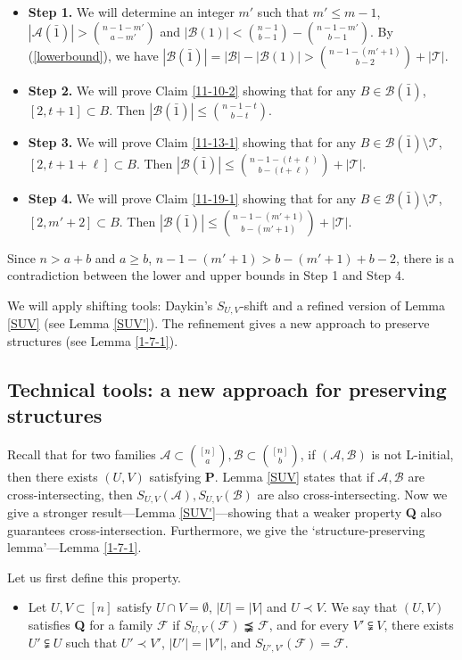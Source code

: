 \documentclass[11pt]{article}
\newcommand{\m}{\mathcal}
\begin{document}
\begin{itemize}
    \item 
{\bf Step 1.}
We will determine an integer $m'$ such that $m'\le m-1$,
$|\m A(\bar{1})|>{n-1-m'\choose a-m'}$ and $|\m B(1)|<{n-1\choose b-1}-{n-1-m'\choose b-1}$. 
By (\ref{lowerbound}), we have 
$
|\m B(\bar1)|=|\m B|-|\m B(1)|>{n-1-(m'+1)\choose b-2}+|\m T|.
$

\item 
{\bf Step 2.}
We will prove Claim \ref{11-10-2} showing that for any $B\in \m B(\bar1)$, $[2,t+1]\subset B$. Then $|\m B(\bar1)|\le {n-1-t\choose b-t}$. 

\item 
{\bf Step 3.}
We will prove Claim \ref{11-13-1} showing that for any $B\in \m B(\bar1)\setminus \m T$, $[2,t+1+\ell]\subset B$. Then $|\m B(\bar1)|\le {n-1-(t+\ell)\choose b-(t+\ell)}+|\m T|$. 

\item 
{\bf Step 4.}
We will prove Claim \ref{11-19-1} showing that for any $B\in \m B(\bar1)\setminus \m T$, $[2,m'+2]\subset B$. Then $|\m B(\bar1)|\le {n-1-(m'+1)\choose b-(m'+1)}+|\m T|$. 
\end{itemize} 

Since $n>a+b$ and $a\ge b$, $n-1-(m'+1)>b-(m'+1)+b-2$,   
 there is a contradiction between the lower and upper bounds in Step 1 and Step 4. 


We will apply shifting tools:
Daykin's $S_{U,V}$-shift and
a refined version of Lemma \ref{SUV} (see Lemma \ref{SUV'}).
The refinement gives a new approach to preserve structures (see Lemma \ref{1-7-1}).

\subsection{Technical tools: a new approach for preserving structures}\label{tool}
Recall that for two families $\m A\subset {[n]\choose a}, \m B\subset {[n]\choose b}$, if $(\m A,\m B)$ is not L-initial, then there exists $(U,V)$ satisfying {\bf P}. 
Lemma \ref{SUV} states that if $\m A, \m B$ are cross-intersecting, then $S_{U,V}(\m A), S_{U,V}(\m B)$ are also cross-intersecting.
Now we give a stronger result---Lemma \ref{SUV'}---showing that a weaker property {\bf Q} also guarantees cross-intersection. 
Furthermore, we give the `structure-preserving lemma'---Lemma \ref{1-7-1}.

Let us first define this property.

\begin{itemize}
\item[{\bf Q}] Let $U,V\subset [n]$ satisfy 
$U\cap V=\emptyset$, $|U|=|V|$ and $U\prec V$.
We say that $(U,V)$ satisfies {\bf Q} for a family $\m F$ if $S_{U,V}(\m F)\precneqq \m F$, and 
for every $V'\subsetneqq V$, there exists $U'\subsetneqq U$ such that $U'\prec V'$, $|U'|=|V'|$, and $S_{U',V'}(\m F)=\m F$. 
\end{itemize}
\end{document}
